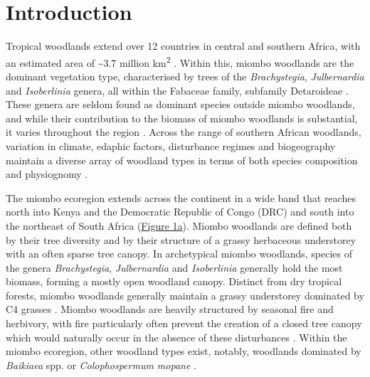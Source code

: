 \documentclass[diversity,article,submit,moreauthors,pdftex]{Definitions/mdpi}
\begin{document}

\section{Introduction}

Tropical woodlands extend over 12 countries in central and southern Africa, with an estimated area of \textasciitilde{}3.7 million km\textsuperscript{2} \citep{White1983, Mayaux2004, Arino2010}. Within this, miombo woodlands are the dominant vegetation type, characterised by trees of the \textit{Brachystegia}, \textit{Julbernardia} and \textit{Isoberlinia} genera, all within the Fabaceae family, subfamily Detaroideae \citep{Chidumayo1997, Campbell2002, Azani2017}. These genera are seldom found as dominant species outside miombo woodlands, and while their contribution to the biomass of miombo woodlands is substantial, it varies throughout the region \citep{Campbell2002}. Across the range of southern African woodlands, variation in climate, edaphic factors, disturbance regimes and biogeography maintain a diverse array of woodland types in terms of both species composition and physiognomy \citep{Privette2004, Caylor2004, Chidumayo2002}. 

The miombo ecoregion extends across the continent in a wide band that reaches north into Kenya and the Democratic Republic of Congo (DRC) and south into the northeast of South Africa (\hyperref[plot_map]{Figure 1a}). Miombo woodlands are defined both by their tree diversity and by their structure of a grassy herbaceous understorey with an often sparse tree canopy. In archetypical miombo woodlands, species of the genera \textit{Brachystegia}, \textit{Julbernardia} and \textit{Isoberlinia} generally hold the most biomass, forming a mostly open woodland canopy. Distinct from dry tropical forests, miombo woodlands generally maintain a grassy understorey dominated by C4 grasses \citep{Dexter2015}. Miombo woodlands are heavily structured by seasonal fire and herbivory, with fire particularly often prevent the creation of a closed tree canopy which would naturally occur in the absence of these disturbances \citep{Oliveras2016, Dantas2016}. Within the miombo ecoregion, other woodland types exist, notably, woodlands dominated by \textit{Baikiaea} spp. or \textit{Colophospermum mopane} \citep{Campbell2002}.
\end{document}
